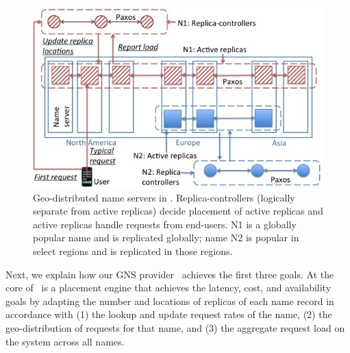 \begin{figure}[t]
\centering
\includegraphics[scale=0.4]{auspice/gns-dns/Slide3.jpg}
\vspace{-0.2in}
\caption{Geo-distributed name servers in \auspice.  Replica-controllers  (logically separate from active replicas) decide placement of active replicas and active replicas handle requests from end-users. N1 is a globally popular name and is replicated globally; name N2 is  popular in select regions and is replicated in those regions.}
\vspace{-0.2in}
\label{fig:auspice}
\end{figure}


Next, we explain how our GNS provider \auspice\ achieves the first three goals. At the core of \auspice\ is a placement engine that achieves the latency, cost, and availability goals by adapting the number and locations of replicas of each name record in accordance with (1) the lookup and update request rates of the name, (2) the geo-distribution of requests for that name, and (3) the aggregate request load on the system across all names. 



